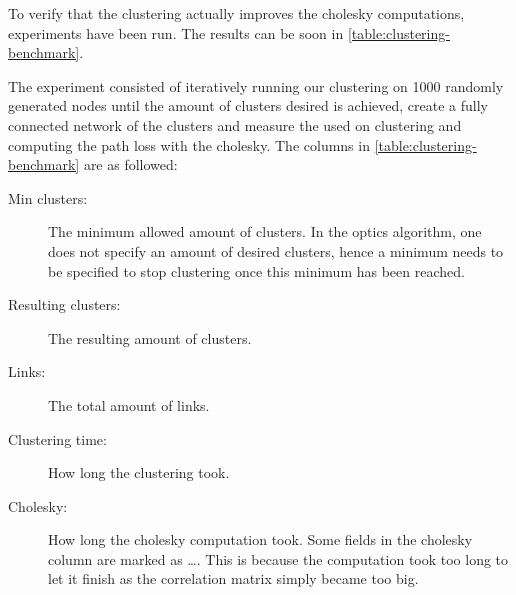 To verify that the clustering actually improves the cholesky computations, experiments have been run. The results can be soon in \autoref{table:clustering-benchmark}.\medbreak

The experiment consisted of iteratively running our clustering on 1000 randomly generated nodes until the amount of clusters desired is achieved, create a fully connected network of the clusters and measure the used on clustering and computing the path loss with the cholesky. The columns in \autoref{table:clustering-benchmark} are as followed:

\begin{description}
    \item[Min clusters:] The minimum allowed amount of clusters. In the \gls{optics} algorithm, one does not specify an amount of desired clusters, hence a minimum needs to be specified to stop clustering once this minimum has been reached.
    \item[Resulting clusters:] The resulting amount of clusters.
    \item[Links:] The total amount of links.
    \item[Clustering time:] How long the clustering took.
    \item[Cholesky:] How long the cholesky computation took. Some fields in the cholesky column are marked as \dots. This is because the computation took too long to let it finish as the correlation matrix simply became too big.
\end{description}






